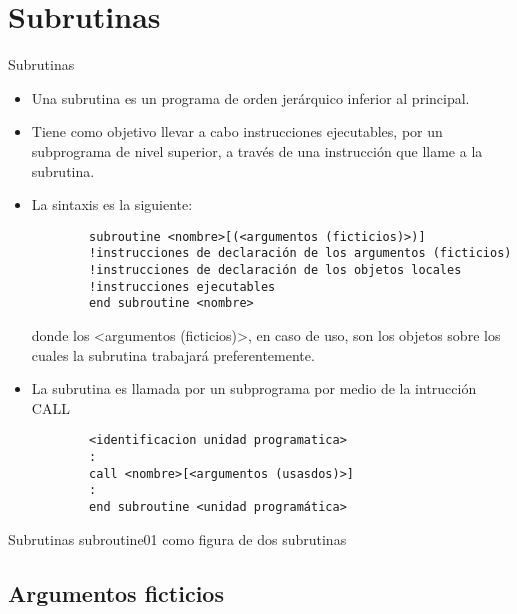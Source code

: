
\section{Subrutinas}  



\begin{frame}[fragile]{Subrutinas}
 \begin{itemize}[<+(0)->]
  \item Una subrutina es un programa de orden jerárquico inferior al principal.
  \item Tiene como objetivo llevar a cabo instrucciones ejecutables, por un subprograma de nivel superior, a través de una instrucción que llame a la subrutina.
  \item La sintaxis es la siguiente:\\ 
        \begin{verbatim}
        subroutine <nombre>[(<argumentos (ficticios)>)]
        !instrucciones de declaración de los argumentos (ficticios)
        !instrucciones de declaración de los objetos locales
        !instrucciones ejecutables
        end subroutine <nombre>
        \end{verbatim}
    donde los <argumentos (ficticios)>, en caso de uso, son los objetos sobre los cuales la subrutina trabajará preferentemente.
  \item La subrutina es llamada por un subprograma por medio de la intrucción CALL
        \begin{verbatim}
        <identificacion unidad programatica>
        :
        call <nombre>[<argumentos (usasdos)>]
        :
        end subroutine <unidad programática>
        \end{verbatim}  
 \end{itemize}
\end{frame}


\begin{frame}[fragile]{Subrutinas}
 subroutine01 como figura de dos subrutinas
\end{frame}


\subsection{Argumentos ficticios}


